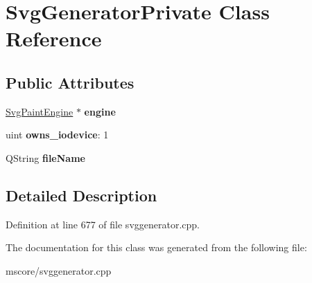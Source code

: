 \hypertarget{class_svg_generator_private}{}\section{Svg\+Generator\+Private Class Reference}
\label{class_svg_generator_private}
\subsection*{Public Attributes}
\begin{DoxyCompactItemize}
\item 
\mbox{\label{class_svg_generator_private_a9f033b3e4123c2ab6265086de8520707}} 
\hyperlink{class_svg_paint_engine}{Svg\+Paint\+Engine} $\ast$ {\bfseries engine}
\item 
\mbox{\label{class_svg_generator_private_a076b8b41cc37c2ce85b64fc6732dbdae}} 
uint {\bfseries owns\+\_\+iodevice}\+: 1
\item 
\mbox{\label{class_svg_generator_private_a86f2a81dbb0615d9cbf9b4221e5cdc8a}} 
Q\+String {\bfseries file\+Name}
\end{DoxyCompactItemize}


\subsection{Detailed Description}


Definition at line 677 of file svggenerator.\+cpp.



The documentation for this class was generated from the following file\+:\begin{DoxyCompactItemize}
\item 
mscore/svggenerator.\+cpp\end{DoxyCompactItemize}
